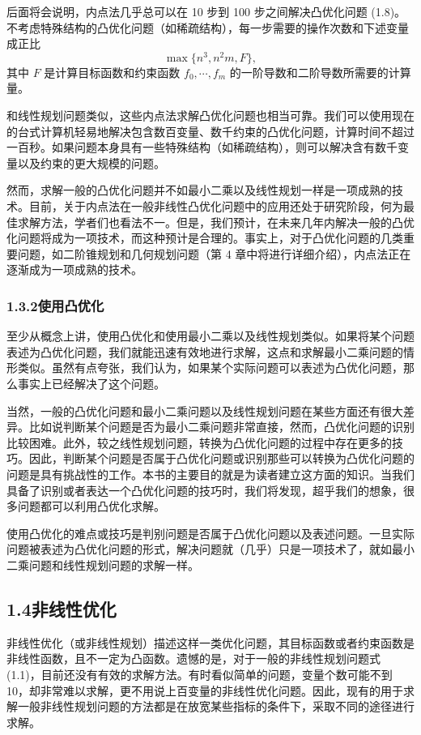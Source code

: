 \documentclass[UTF8,12pt,a4paper,fontset=fandol]{ctexart}
\begin{document}
后面将会说明，内点法几乎总可以在 10 步到 100 步之间解决凸优化问题 (1.8)。不考虑特殊结构的凸优化问题（如稀疏结构），每一步需要的操作次数和下述变量成正比
\[
  \max\{n^3,n^2m,F\},
\]
其中 $F$ 是计算目标函数和约束函数 $f_0,\cdots,f_m$ 的一阶导数和二阶导数所需要的计算量。

和线性规划问题类似，这些内点法求解凸优化问题也相当可靠。我们可以使用现在的台式计算机轻易地解决包含数百变量、数千约束的凸优化问题，计算时间不超过一百秒。如果问题本身具有一些特殊结构（如稀疏结构），则可以解决含有数千变量以及约束的更大规模的问题。

然而，求解一般的凸优化问题并不如最小二乘以及线性规划一样是一项成熟的技术。目前，关于内点法在一般非线性凸优化问题中的应用还处于研究阶段，何为最佳求解方法，学者们也看法不一。但是，我们预计，在未来几年内解决一般的凸优化问题将成为一项技术，而这种预计是合理的。事实上，对于凸优化问题的几类重要问题，如二阶锥规划和几何规划问题（第 4 章中将进行详细介绍），内点法正在逐渐成为一项成熟的技术。

\subsubsection*{1.3.2\quad 使用凸优化}

至少从概念上讲，使用凸优化和使用最小二乘以及线性规划类似。如果将某个问题表述为凸优化问题，我们就能迅速有效地进行求解，这点和求解最小二乘问题的情形类似。虽然有点夸张，我们认为，如果某个实际问题可以表述为凸优化问题，那么事实上已经解决了这个问题。

当然，一般的凸优化问题和最小二乘问题以及线性规划问题在某些方面还有很大差异。比如说判断某个问题是否为最小二乘问题非常直接，然而，凸优化问题的识别比较困难。此外，较之线性规划问题，转换为凸优化问题的过程中存在更多的技巧。因此，判断某个问题是否属于凸优化问题或识别那些可以转换为凸优化问题的问题是具有挑战性的工作。本书的主要目的就是为读者建立这方面的知识。当我们具备了识别或者表达一个凸优化问题的技巧时，我们将发现，超乎我们的想象，很多问题都可以利用凸优化求解。

使用凸优化的难点或技巧是判别问题是否属于凸优化问题以及表述问题。一旦实际问题被表述为凸优化问题的形式，解决问题就（几乎）只是一项技术了，就如最小二乘问题和线性规划问题的求解一样。

\subsection*{1.4\quad 非线性优化}

非线性优化（或非线性规划）描述这样一类优化问题，其目标函数或者约束函数是非线性函数，且不一定为凸函数。遗憾的是，对于一般的非线性规划问题式 (1.1)，目前还没有有效的求解方法。有时看似简单的问题，变量个数可能不到 10，却非常难以求解，更不用说上百变量的非线性优化问题。因此，现有的用于求解一般非线性规划问题的方法都是在放宽某些指标的条件下，采取不同的途径进行求解。
\end{document}
